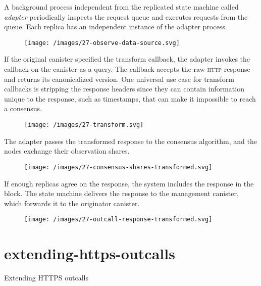 \documentclass{article}
\begin{document}
A background process independent from the replicated state machine called \emph{adapter} periodically inspects the request queue and executes requests from the queue.
Each replica has an independent instance of the adapter process.

\begin{figure}[grayscale-diagram,p75]
\texttt{[image: /images/27-observe-data-source.svg]}
\end{figure}

If the original canister specified the transform callback, the adapter invokes the callback on the canister as a query.
The callback accepts the raw \textsc{http} response and returns its canonicalized version.
One universal use case for transform callbacks is stripping the response headers since they can contain information unique to the response, such as timestamps, that can make it impossible to reach a consensus.

\begin{figure}[grayscale-diagram,p75]
\texttt{[image: /images/27-transform.svg]}
\end{figure}

The adapter passes the transformed response to the consensus algorithm, and the nodes exchange their observation shares.

\begin{figure}[grayscale-diagram,p75]
\label{fig-consensus-shares-transformed}
\texttt{[image: /images/27-consensus-shares-transformed.svg]}
\end{figure}

If enough replicas agree on the response, the system includes the response in the block.
The state machine delivers the response to the management canister, which forwards it to the originator canister.

\begin{figure}[grayscale-diagram,p75]
\texttt{[image: /images/27-outcall-response-transformed.svg]}
\end{figure}

\section{extending-https-outcalls}{Extending HTTPS outcalls}
\end{document}
